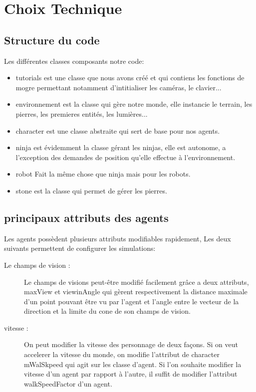 \section{Choix Technique}
\thispagestyle{fancy}

\subsection{Structure du code}
Les différentes classes composants notre code:
\begin{itemize}
\item tutorials est une classe que nous avons créé et qui contiens les
  fonctions de mogre permettant notamment d'intitialiser les caméras,
  le clavier...
\item environnement est la classe qui gère notre monde, elle instancie
  le terrain, les pierres, les premieres entités, les lumières...
\item character est une classe abstraite qui sert de base pour nos
  agents.
\item ninja est évidemment la classe gérant les ninjas, elle est
  autonome, a l'exception des demandes de position qu'elle effectue à
  l'environnement.
\item robot Fait la même chose que ninja mais pour les robots.
\item stone est la classe qui permet de gérer les pierres. 
\end{itemize}

\subsection{principaux attributs des agents}

Les agents possèdent plusieurs attributs modifiables rapidement, Les
deux suivants permettent de configurer les simulations:

\begin{description}
\item[Le champs de vision :] Le champs de visions peut-être modifié
  facilement grâce a deux attributs, maxView et viewinAngle qui gèrent
  respectivement la distance maximale d'un point pouvant être vu par
  l'agent et l'angle entre le vecteur de la direction et la limite du
  cone de son champs de vision.
\item[vitesse :] On peut modifier la vitesse des personnage de deux
  façons. Si on veut accelerer la vitesse du monde, on modifie
  l'attribut de character mWalSkpeed qui agit sur les classe
  d'agent. Si l'on souhaite modifier la vitesse d'un agent par rapport
  à l'autre, il suffit de modifier l'attribut walkSpeedFactor d'un
  agent.
\end{description}

